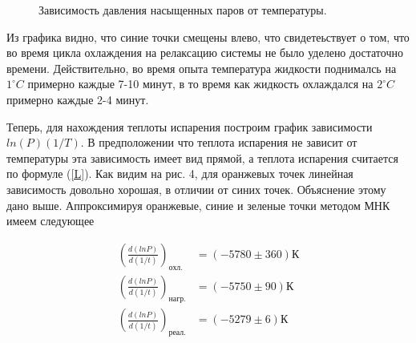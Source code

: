 \documentclass[a4paper, 12pt]{article}
\begin{document}
    \begin{figure}[h]
        \caption{Зависимость давления насыщенных паров от температуры.}
        \label{P(T)}
    \end{figure}

    Из графика видно, что синие точки смещены влево, что свидетеьствует о том, что во время цикла охлаждения на релаксацию системы не было уделено достаточно времени. Действительно, во время опыта температура жидкости поднималсь на $1 ^\circ C$ примерно каждые 7-10 минут, в то время как жидкость охлаждался на $2 ^\circ C$ примерно каждые 2-4 минут.

    Теперь, для нахождения теплоты испарения построим график зависимости $ln(P) (1/T)$. В предположении что теплота испарения не зависит от температуры эта зависимость имеет вид прямой, а теплота испарения считается по формуле (\ref{L}). Как видим на рис. 4, для оранжевых точек линейная зависимость довольно хорошая, в отличии от синих точек. Объяснение этому дано выше. Аппроксимируя оранжевые, синие и зеленые точки методом МНК имеем следующее

    \begin{align}
        \left(\frac{d(lnP)}{d(1/t)}\right)_{охл.} &= (-5780 \pm 360) К \\
        \left(\frac{d(lnP)}{d(1/t)}\right)_{нагр.} &= (-5750 \pm 90) К\\
        \left(\frac{d(lnP)}{d(1/t)}\right)_{реал.} &= (-5279 \pm 6) К
    \end{align}
\end{document}
